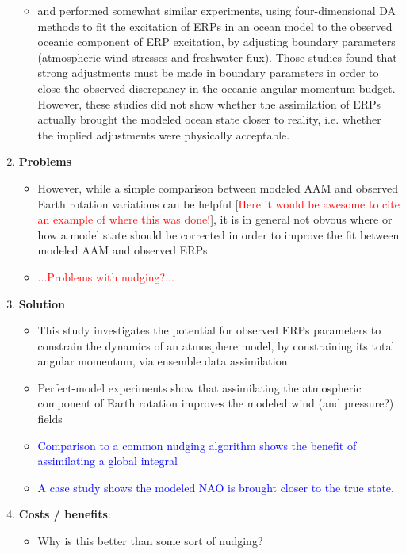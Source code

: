 \documentclass[draft,jgrga]{agutex}
\begin{document}
\begin{article}
\begin{enumerate}
\begin{itemize}
 \item \citet{saynischetal2011a,saynischetal2011b} and \citet{saynischthomas2012}
performed somewhat similar experiments, using four-dimensional DA methods to fit
the excitation of ERPs in an ocean model to the observed oceanic component of
ERP excitation, by adjusting boundary parameters (atmospheric wind stresses and
freshwater flux).
Those studies found that strong adjustments must be made in boundary
parameters in order to close the observed discrepancy in the oceanic angular
momentum budget.
However, these studies  did not show  whether the assimilation of ERPs
actually brought the modeled ocean state closer to reality, i.e. whether the
implied adjustments were physically acceptable.
\end{itemize}

%
\item \textbf{Problems}
\begin{itemize}
 \item However, while  a simple comparison between modeled AAM and observed Earth rotation variations can be helpful [\textcolor{red}{Here it would be awesome to cite an example of where this was done!}], it is in general not obvous where or how a model state should be corrected in order to improve the fit between modeled AAM and observed ERPs. 
 \item \textcolor{red}{...Problems with nudging?...}
\end{itemize}
%
%
\item \textbf{Solution}
\begin{itemize}
 \item This study investigates the potential for observed ERPs parameters to constrain the dynamics of an atmosphere model, by constraining its total angular momentum, via ensemble data assimilation.
 \item Perfect-model experiments show that assimilating the atmospheric component of Earth rotation improves the modeled wind (and pressure?) fields
 \item \textcolor{blue}{Comparison to a common nudging algorithm shows the benefit of assimilating a global integral}
 \item \textcolor{blue}{A case study shows the modeled NAO is brought closer to the true state.}
\end{itemize}
%
%
\item \textbf{Costs / benefits}: 
\begin{itemize}
 \item Why is this better than some sort of nudging?
\end{itemize}
%
%
\end{enumerate}


\end{article}
\end{document}
